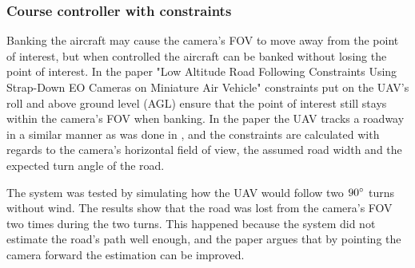 \subsubsection{Course controller with constraints}

Banking the aircraft may cause the camera's FOV to move away from the point of interest, but when controlled the aircraft can be banked without losing the point of interest. In the paper "Low Altitude Road Following Constraints Using Strap-Down EO Cameras on Miniature Air Vehicle" \cite{constraintsEGBERT} constraints put on the UAV's roll and above ground level (AGL) ensure that the point of interest still stays within the camera's FOV when banking. In the paper the UAV tracks a roadway in a similar manner as was done in \cite{skidToTurnMills}, and the constraints are calculated with regards to the camera's horizontal field of view, the assumed road width and the expected turn angle of the road.


The system was tested by simulating how the UAV would follow two $90\degree$ turns without wind. The results show that the road was lost from the camera's FOV two times during the two turns. This happened because the system did not estimate the road's path well enough, and the paper argues that by pointing the camera forward the estimation can be improved.